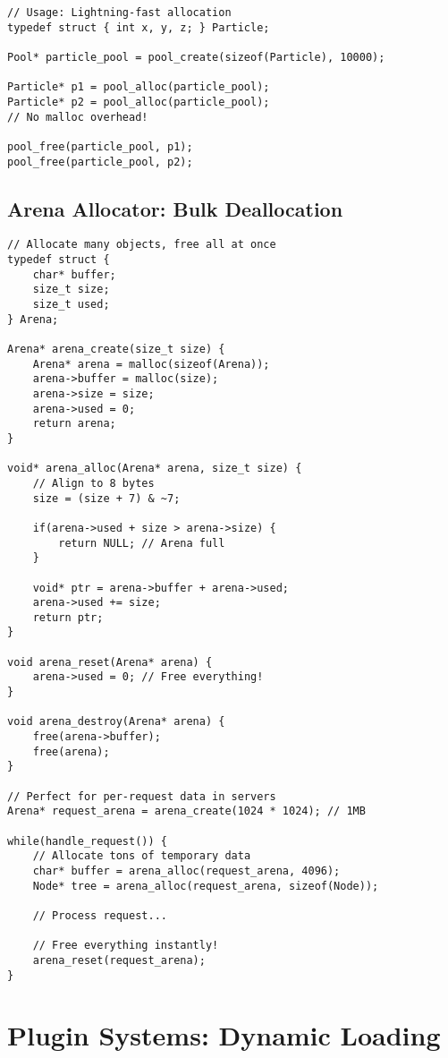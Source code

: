 \begin{description}[style=nextline,leftmargin=0pt]
\begin{lstlisting}
// Usage: Lightning-fast allocation
typedef struct { int x, y, z; } Particle;

Pool* particle_pool = pool_create(sizeof(Particle), 10000);

Particle* p1 = pool_alloc(particle_pool);
Particle* p2 = pool_alloc(particle_pool);
// No malloc overhead!

pool_free(particle_pool, p1);
pool_free(particle_pool, p2);
\end{lstlisting}

\subsection{Arena Allocator: Bulk Deallocation}

\begin{lstlisting}
// Allocate many objects, free all at once
typedef struct {
    char* buffer;
    size_t size;
    size_t used;
} Arena;

Arena* arena_create(size_t size) {
    Arena* arena = malloc(sizeof(Arena));
    arena->buffer = malloc(size);
    arena->size = size;
    arena->used = 0;
    return arena;
}

void* arena_alloc(Arena* arena, size_t size) {
    // Align to 8 bytes
    size = (size + 7) & ~7;

    if(arena->used + size > arena->size) {
        return NULL; // Arena full
    }

    void* ptr = arena->buffer + arena->used;
    arena->used += size;
    return ptr;
}

void arena_reset(Arena* arena) {
    arena->used = 0; // Free everything!
}

void arena_destroy(Arena* arena) {
    free(arena->buffer);
    free(arena);
}

// Perfect for per-request data in servers
Arena* request_arena = arena_create(1024 * 1024); // 1MB

while(handle_request()) {
    // Allocate tons of temporary data
    char* buffer = arena_alloc(request_arena, 4096);
    Node* tree = arena_alloc(request_arena, sizeof(Node));

    // Process request...

    // Free everything instantly!
    arena_reset(request_arena);
}
\end{lstlisting}

\section{Plugin Systems: Dynamic Loading}


\end{description}
